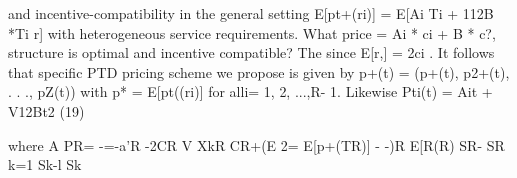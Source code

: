 \documentclass[10pt]{article}
\begin{document}
\begin{ReviewVerbatim}
and incentive-compatibility in the general setting                   E[pt+(ri)] = E[Ai Ti + 112B *Ti r]
with heterogeneous service requirements. What price                                 = Ai * ci + B * c?,
structure is optimal and incentive compatible? The
                                                                    since E[r,] = 2ci . It follows that
specific PTD pricing scheme we propose is given by
p+(t) = (p+(t), p2+(t), . . ., pZ(t)) with                          p* = E[pt((ri)] for alli= 1, 2, ...,R- 1.
                                                                    Likewise
Pti(t) = Ait + V12Bt2 (19)

where                                                                A
                                                                     PR= -=-a'R
                                                                              -2CR V XkR
                                                                                 CR+(E    2= E[p+(TR)]
                                                                                       - -)R E[R(R)
                                                                           SR- SR k=1 Sk-l Sk


\end{ReviewVerbatim}
\end{document}
